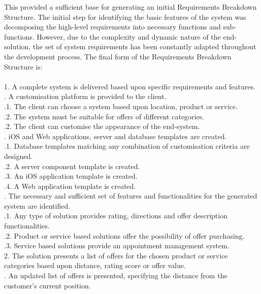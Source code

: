 This provided a sufficient base for generating an initial Requirements Breakdown Structure. The initial step for identifying the basic features of the system was decomposing the high-level requirements into necessary functions and sub-functions. However, due to the complexity and dynamic nature of the end-solution, the set of system requirements has been constantly adapted throughout the development process. The final form of the Requirements Breakdown Structure is:\\\\
1. A complete system is delivered based upon specific requirements and features.\\
. A customisation platform is provided to the client.\\
\indent{}.1. The client can choose a system based upon location, product or service.\\
\indent{}.2. The system must be suitable for offers of different categories.\\
\indent{}.2. The client can customise the appearance of the end-system.\\
. iOS and Web applications, server and database templates are created.\\
\indent{}.1. Database templates matching any combination of customisation criteria are designed.\\
\indent{}.2. A server component template is created.\\
\indent{}.3. An iOS application template is created.\\
\indent{}.4. A Web application template is created.\\
. The necessary and sufficient set of features and functionalities for the generated system are identified.\\
\indent{}.1. Any type of solution provides rating, directions and offer description functionalities.\\
\indent{}.2. Product or service based solutions offer the possibility of offer purchasing.\\
\indent{}.3. Service based solutions provide an appointment management system.\\
2. The solution presents a list of offers for the chosen product or service categories based upon distance, rating score or offer value.\\
. An updated list of offers is presented, specifying the distance from the customer's current position.\\
